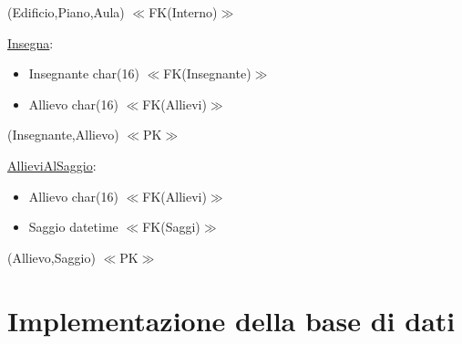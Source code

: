 \documentclass{article}
\begin{document}
(Edificio,Piano,Aula) $\ll$FK(Interno)$\gg$

\medskip

\begin{flushleft}
\underline{Insegna}:
\end{flushleft}

\begin{itemize}
\item Insegnante char(16) $\ll$FK(Insegnante)$\gg$
\item Allievo char(16) $\ll$FK(Allievi)$\gg$
\end{itemize}

(Insegnante,Allievo) $\ll$PK$\gg$

\medskip

\begin{flushleft}
\underline{AllieviAlSaggio}:
\end{flushleft}

\begin{itemize}
\item Allievo char(16) $\ll$FK(Allievi)$\gg$
\item Saggio datetime $\ll$FK(Saggi)$\gg$
\end{itemize}

 (Allievo,Saggio) $\ll$PK$\gg$



\newpage
\section{Implementazione della base di dati}
\end{document}
